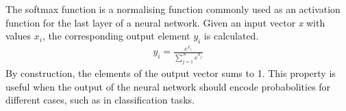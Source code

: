 \begin{enumerate}
                    \vspace{3mm}
                    The softmax function is a normalising function commonly used as an activation
                    function for the last layer of a neural network. Given an input vector \emph{x} 
                    with values \emph{$x_i$}, the corresponding output element \emph{$y_i$} is calculated.
                    \begin{align}
                        y_i = \frac{e^{x_i}}{\displaystyle\sum_{j=1}^N e^{x_j}}
                    \end{align}
                    By construction, the elements of the output vector sums to 1. This property is useful
                    when the output of the neural network should encode probabolities for different
                    cases, such as in classification tasks.
            \end{enumerate}

